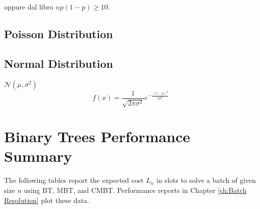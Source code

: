 \begin{appendices}
oppure dal libro $np(1-p)\geq 10$.




\subsection{Poisson Distribution}

\subsection{Normal Distribution}

 $\mathcal{N}(\mu,\sigma^{2})$
\begin{equation}
f(x)= \frac{1}{\sqrt{2\pi\sigma^{2}}}e^{\displaystyle{-\frac{(x-\mu)^{2}}{2\sigma^{2}}}}
\end{equation}

\section{Binary Trees Performance Summary}
The following tables report the expected cost $L_{n}$ in slots to solve a batch of given size $n$ using BT, MBT, and CMBT. Performance reports in Chapter \ref{ch:Batch Resolution} plot these data.
\begin{table}[H]
\caption{\emph{Basic Binary Tree}: performance report}
\begin{center}
\end{center}
\end{table}


\end{appendices}
